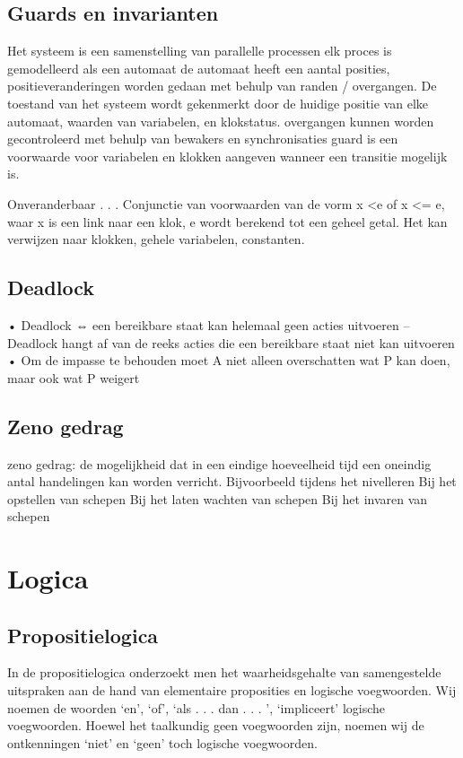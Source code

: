 \documentclass{article}
\begin{document}
	\subsection{Guards en invarianten}
	Het systeem is een samenstelling van parallelle processen
	elk proces is gemodelleerd als een automaat
	de automaat heeft een aantal posities,
	positieveranderingen worden gedaan met behulp van randen /
	overgangen.
	De toestand van het systeem wordt gekenmerkt door
	de huidige
	positie van elke automaat,
	waarden van variabelen, en
	klokstatus.
	overgangen kunnen worden gecontroleerd met behulp van bewakers
	en synchronisaties
	guard is een voorwaarde voor variabelen en klokken
	aangeven wanneer een transitie mogelijk is.
	
	
	Onveranderbaar . . . Conjunctie van voorwaarden van de vorm x <e of x <= e,
	waar
	x is een link naar een klok,
	e wordt berekend tot een geheel getal.
	Het kan verwijzen naar klokken, gehele variabelen, constanten.
	
	
	
	
	\subsection{Deadlock}
	• Deadlock ⇔ een bereikbare staat kan helemaal geen acties uitvoeren – Deadlock hangt af van de reeks acties die een bereikbare staat niet kan uitvoeren • Om de impasse te behouden moet A niet alleen overschatten wat P kan doen, maar ook wat P weigert
	\subsection{Zeno gedrag}
	zeno gedrag: de mogelijkheid dat in een eindige hoeveelheid tijd een oneindig antal handelingen kan worden verricht.
	Bijvoorbeeld tijdens het nivelleren
	Bij het opstellen van schepen
	Bij het laten wachten van schepen
	Bij het invaren van schepen
	
	\section{Logica}
	
	
	
	\subsection{Propositielogica}
	
	
	In de propositielogica onderzoekt men het waarheidsgehalte van samengestelde uitspraken
	aan de hand van elementaire proposities en logische voegwoorden. Wij noemen de
	woorden ‘en’, ‘of’, ‘als . . . dan . . . ’, ‘impliceert’ logische voegwoorden. Hoewel het taalkundig
	geen voegwoorden zijn, noemen wij de ontkenningen ‘niet’ en ‘geen’ toch logische
	voegwoorden.
	
\end{document}
